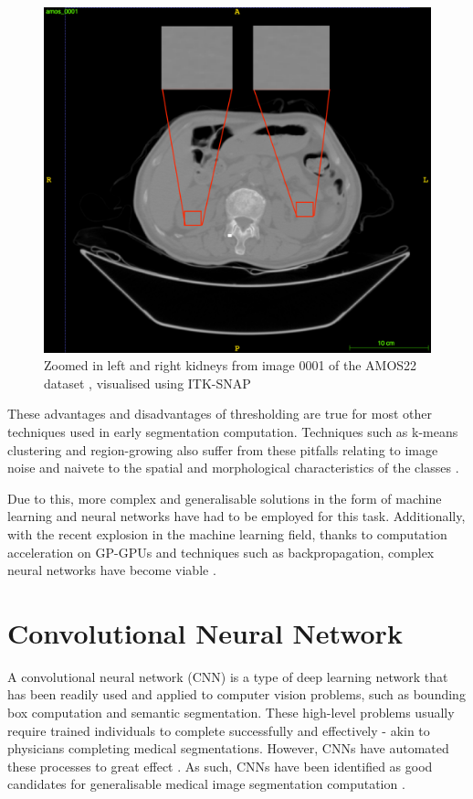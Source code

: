 \documentclass{l4proj}
\begin{document}
\begin{figure}[htb]
    \centering
    \includegraphics[width=0.5\linewidth]{images/kidney_intensities.png}    

    \caption{Zoomed in left and right kidneys from image 0001 of the AMOS22 dataset \citep{ji2022amos}, visualised using ITK-SNAP \citep{itksnap}}

    \label{fig:kidney_intensities} 
\end{figure}

These advantages and disadvantages of thresholding are true for most other techniques used in early segmentation computation. Techniques such as k-means clustering and region-growing also suffer from these pitfalls relating to image noise and naivete to the spatial and morphological characteristics of the classes \citep{patil2013medical, sharma2010automated, rogowska2000overview, pham2000current}.

Due to this, more complex and generalisable solutions in the form of machine learning and neural networks have had to be employed for this task. Additionally, with the recent explosion in the machine learning field, thanks to computation acceleration on GP-GPUs and techniques such as backpropagation, complex neural networks have become viable \citep{lee2017deep}.

\section{Convolutional Neural Network}

A convolutional neural network (CNN) is a type of deep learning network that has been readily used and applied to computer vision problems, such as bounding box computation and semantic segmentation. These high-level problems usually require trained individuals to complete successfully and effectively - akin to physicians completing medical segmentations. However, CNNs have automated these processes to great effect \citep{wang2022yolov7, briot2018analysis}. As such, CNNs have been identified as good candidates for generalisable medical image segmentation computation \citep{kayalibay2017CNNbased}.
\end{document}
